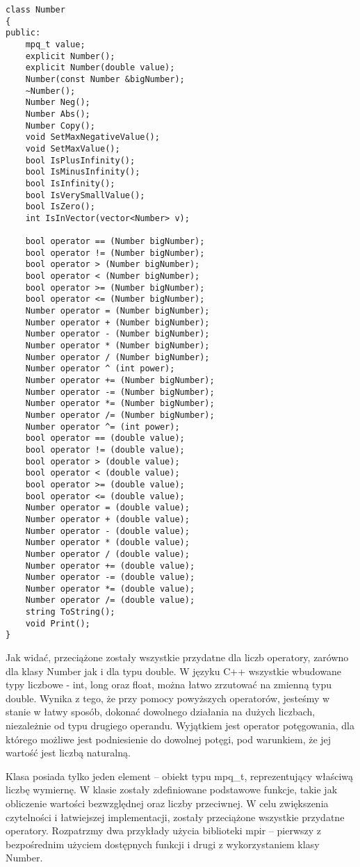 \documentclass[twoside,a4paper]{book}
\begin{document}
\begin{lstlisting}
class Number
{
public:
	mpq_t value;
	explicit Number();
	explicit Number(double value);
	Number(const Number &bigNumber);
	~Number();
	Number Neg();
	Number Abs();
	Number Copy();
	void SetMaxNegativeValue();
	void SetMaxValue();
	bool IsPlusInfinity();
	bool IsMinusInfinity();
	bool IsInfinity();
	bool IsVerySmallValue();
	bool IsZero();
	int IsInVector(vector<Number> v);
	
	bool operator == (Number bigNumber);
	bool operator != (Number bigNumber);
	bool operator > (Number bigNumber);
	bool operator < (Number bigNumber);
	bool operator >= (Number bigNumber);
	bool operator <= (Number bigNumber);
	Number operator = (Number bigNumber);
	Number operator + (Number bigNumber);
	Number operator - (Number bigNumber);
	Number operator * (Number bigNumber);
	Number operator / (Number bigNumber);
	Number operator ^ (int power);
	Number operator += (Number bigNumber);
	Number operator -= (Number bigNumber);
	Number operator *= (Number bigNumber);
	Number operator /= (Number bigNumber);
	Number operator ^= (int power);
	bool operator == (double value);
	bool operator != (double value);
	bool operator > (double value);
	bool operator < (double value);
	bool operator >= (double value);
	bool operator <= (double value);
	Number operator = (double value);
	Number operator + (double value);
	Number operator - (double value);
	Number operator * (double value);
	Number operator / (double value);
	Number operator += (double value);
	Number operator -= (double value);
	Number operator *= (double value);
	Number operator /= (double value);
	string ToString();
	void Print();
}
\end{lstlisting}

Jak widać, przeciążone zostały wszystkie przydatne dla liczb operatory, zarówno dla klasy Number jak i dla typu double. W języku C++ wszystkie wbudowane typy liczbowe - int, long oraz float, można łatwo zrzutować na zmienną typu double. Wynika z tego, że przy pomocy powyższych operatorów, jesteśmy w stanie w łatwy sposób, dokonać dowolnego działania na dużych liczbach, niezależnie od typu drugiego operandu. Wyjątkiem jest operator potęgowania, dla którego możliwe jest podniesienie do dowolnej potęgi, pod warunkiem, że jej wartość jest liczbą naturalną.

Klasa posiada tylko jeden element – obiekt typu mpq\_t, reprezentujący właściwą liczbę wymiernę. W klasie zostały zdefiniowane podstawowe funkcje, takie jak obliczenie wartości bezwzględnej oraz liczby przeciwnej. W celu zwiększenia czytelności i łatwiejszej implementacji, zostały przeciążone wszystkie przydatne operatory. Rozpatrzmy dwa przykłady użycia biblioteki mpir – pierwszy z bezpośrednim użyciem dostępnych funkcji i drugi z wykorzystaniem klasy Number.
\end{document}
